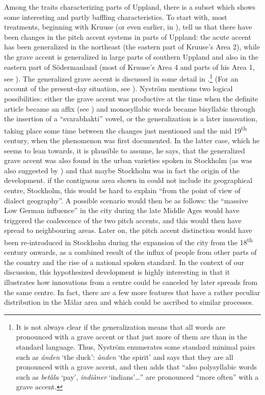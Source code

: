 Among the traits characterizing parts of Uppland, there is a subset which shows some interesting and partly baffling characteristics. To start with, most treatments, beginning with Kruuse (or even earlier, in \citealt{Rydqvist1868}), tell us that there have been changes in the pitch accent systems in parts of Uppland: the acute accent has been generalized in the northeast (the eastern part of Kruuse’s Area 2), while the grave accent is generalized in large parts of southern Uppland and also in the eastern part of Södermanland (most of Kruuse’s Area 4 and parts of his Area 1, see ). The generalized grave accent is discussed in some detail in \citet{Nyström1997}.\footnote{ It is not always clear if the generalization means that all words are pronounced with a grave accent or that just more of them are than in the standard language. Thus, Nyström enumerates some standard minimal pairs such as \textit{ánden} ‘the duck’: \textit{ànden} ‘the spirit’ and says that they are all pronounced with a grave accent, and then adds that “also polysyllabic words such as \textit{betàla} ‘pay’, \textit{indiàner} ‘indians’…” are pronounced “more often” with a grave accent. } (For an account of the present-day situation, see \citealt{Ericsson2006}). Nyström mentions two logical possibilities: either the grave accent was productive at the time when the definite article became an affix (see ) and monosyllabic words became bisyllabic through the insertion of a “svarabhakti” vowel, or the generalization is a later innovation, taking place some time between the changes just mentioned and the mid 19\textsuperscript{th} century, when the phenomenon was first documented. In the latter case, which he seems to lean towards, it is plausible to assume, he says, that the generalized grave accent was also found in the urban varieties spoken in Stockholm (as was also suggested by \citealt{Otterbjörk1982}) and that maybe Stockholm was in fact the origin of the development. if the contiguous area shown in  could not include its geographical centre, Stockholm, this would be hard to explain “from the point of view of dialect geography”. A possible scenario would then be as follows: the “massive Low German influence” in the city during the late Middle Ages would have triggered the coalescence of the two pitch accents, and this would then have spread to neighbouring areas. Later on, the pitch accent distinction would have been re-introduced in Stockholm during the expansion of the city from the 18\textsuperscript{th} century onwards, as a combined result of the influx of people from other parts of the country and the rise of a national spoken standard. In the context of our discussion, this hypothesized development is highly interesting in that it illustrates how innovations from a centre could be canceled by later spreads from the same centre. In fact, there are a few more features that have a rather peculiar distribution in the Mälar area and which could be ascribed to similar processes. 

